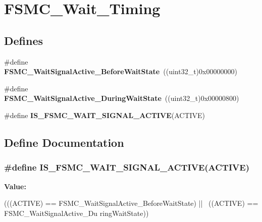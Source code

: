 \hypertarget{group__FSMC__Wait__Timing}{
\section{FSMC\_\-Wait\_\-Timing}
\label{group__FSMC__Wait__Timing}
}
\subsection*{Defines}
\begin{DoxyCompactItemize}
\item 
\hypertarget{group__FSMC__Wait__Timing_ga62c6855a7cc65b20024085f09cdc65e8}{
\#define {\bfseries FSMC\_\-WaitSignalActive\_\-BeforeWaitState}~((uint32\_\-t)0x00000000)}
\label{group__FSMC__Wait__Timing_ga62c6855a7cc65b20024085f09cdc65e8}

\item 
\hypertarget{group__FSMC__Wait__Timing_gae905fc59e5d99091d132d7c221c8b6d4}{
\#define {\bfseries FSMC\_\-WaitSignalActive\_\-DuringWaitState}~((uint32\_\-t)0x00000800)}
\label{group__FSMC__Wait__Timing_gae905fc59e5d99091d132d7c221c8b6d4}

\item 
\#define {\bfseries IS\_\-FSMC\_\-WAIT\_\-SIGNAL\_\-ACTIVE}(ACTIVE)
\end{DoxyCompactItemize}


\subsection{Define Documentation}
\hypertarget{group__FSMC__Wait__Timing_ga3edb40c756afa8bb78550b7e22ded093}{
\subsubsection[{IS\_\-FSMC\_\-WAIT\_\-SIGNAL\_\-ACTIVE}]{\setlength{\rightskip}{0pt plus 5cm}\#define IS\_\-FSMC\_\-WAIT\_\-SIGNAL\_\-ACTIVE(ACTIVE)}}
\label{group__FSMC__Wait__Timing_ga3edb40c756afa8bb78550b7e22ded093}
{\bfseries Value:}
\begin{DoxyCode}
(((ACTIVE) == FSMC_WaitSignalActive_BeforeWaitState) || \
                                            ((ACTIVE) == FSMC_WaitSignalActive_Du
      ringWaitState))
\end{DoxyCode}
